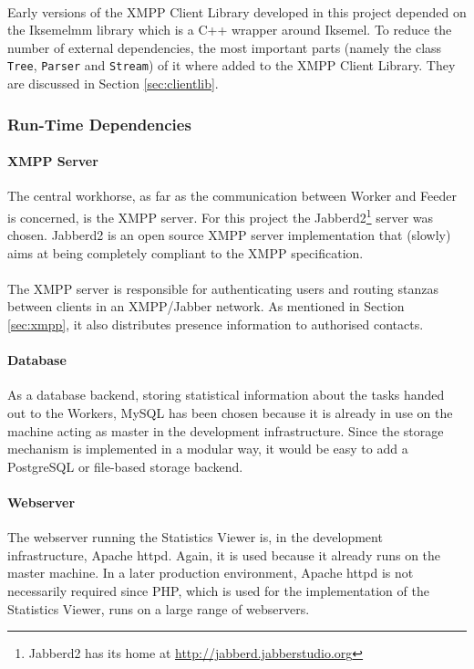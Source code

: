 \paragraph{}
Early versions of the XMPP Client Library developed in this project depended on the Iksemelmm library which is a C++ wrapper around Iksemel. To reduce the number of external dependencies, the most important parts (namely the class \texttt{Tree}, \texttt{Parser} and \texttt{Stream}) of it where added to the XMPP Client Library. They are discussed in Section \ref{sec:clientlib}.


\subsubsection{Run-Time Dependencies}
\paragraph{XMPP Server}
The central workhorse, as far as the communication between Worker and Feeder is concerned, is the XMPP server. For this project the Jabberd2\footnote{Jabberd2 has its home at \href{http://jabberd.jabberstudio.org}{http://jabberd.jabberstudio.org}} server was chosen. Jabberd2 is an open source XMPP server implementation that (slowly) aims at being completely compliant to the XMPP specification.
\paragraph{}
The XMPP server is responsible for authenticating users and routing stanzas between clients in an XMPP/Jabber network. As mentioned in Section \ref{sec:xmpp}, it also distributes presence information to authorised contacts.

\paragraph{Database}
As a database backend, storing statistical information about the tasks handed out to the Workers, MySQL has been chosen because it is already in use on the machine acting as master in the development infrastructure. Since the storage mechanism is implemented in a modular way, it would be easy to add a PostgreSQL or file-based storage backend.

\paragraph{Webserver}
The webserver running the Statistics Viewer is, in the development infrastructure, Apache httpd. Again, it is used because it already runs on the master machine. In a later production environment, Apache httpd is not necessarily required since PHP, which is used for the implementation of the Statistics Viewer, runs on a large range of webservers.


